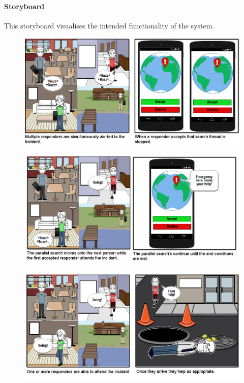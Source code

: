 \documentclass{article}
\begin{document}
		\paragraph{Storyboard}
		This storyboard visualises the intended functionality of the system.
	\begin{figure}[H]
		\centering
		\includegraphics[width=1\textwidth]{"Iteration3/Storyboard - Iteration 2 - 1"}
	\end{figure}
	\begin{figure}[H]
		\centering
		\includegraphics[width=1\textwidth]{"Iteration3/Storyboard - Iteration 2 - 2"}
	\end{figure}
	\begin{figure}[H]
		\centering
		\includegraphics[width=1\textwidth]{"Iteration3/Storyboard - Iteration 2 - 3"}
	\end{figure}
\end{document}
